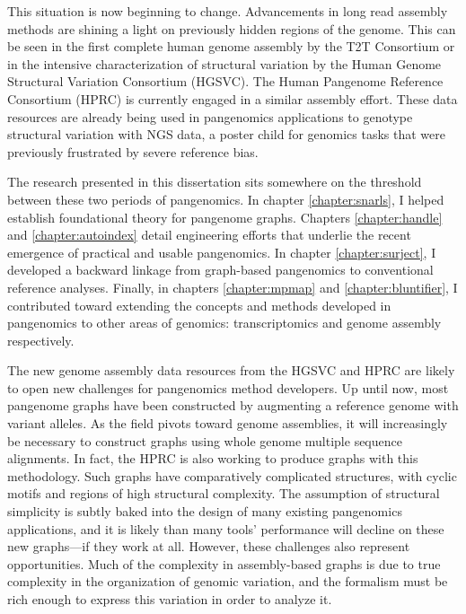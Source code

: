 \documentclass[11pt]{ucthesis}
\begin{document}
This situation is now beginning to change. Advancements in long read assembly methods are shining a light on previously hidden regions of the genome. This can be seen in the first complete human genome assembly by the T2T Consortium\cite{nurk2021complete} or in the intensive characterization of structural variation by the Human Genome Structural Variation Consortium (HGSVC)\cite{chaisson2019multi,ebert2021haplotype}. The Human Pangenome Reference Consortium (HPRC) is currently engaged in a similar assembly effort\cite{genomeweb2021hprc}. These data resources are already being used in pangenomics applications to genotype structural variation with NGS data\cite{ebler2020pangenome,siren2020genotyping}, a poster child for genomics tasks that were previously frustrated by severe reference bias.

The research presented in this dissertation sits somewhere on the threshold between these two periods of pangenomics. In chapter \ref{chapter:snarls}, I helped establish foundational theory for pangenome graphs. Chapters \ref{chapter:handle} and \ref{chapter:autoindex} detail engineering efforts that underlie the recent emergence of practical and usable pangenomics. In chapter \ref{chapter:surject}, I developed a backward linkage from graph-based pangenomics to conventional reference analyses. Finally, in chapters \ref{chapter:mpmap} and \ref{chapter:bluntifier}, I contributed toward extending the concepts and methods developed in pangenomics to other areas of genomics: transcriptomics and genome assembly respectively.

The new genome assembly data resources from the HGSVC and HPRC are likely to open new challenges for pangenomics method developers. Up until now, most pangenome graphs have been constructed by augmenting a reference genome with variant alleles\cite{garrison2018variation,kim2019graph}. As the field pivots toward genome assemblies, it will increasingly be necessary to construct graphs using whole genome multiple sequence alignments\cite{armstrong2020progressive,minkin2020scalable,li2020design}. In fact, the HPRC is also working to produce graphs with this methodology. Such graphs have comparatively complicated structures, with cyclic motifs and regions of high structural complexity. The assumption of structural simplicity is subtly baked into the design of many existing pangenomics applications, and it is likely than many tools' performance will decline on these new graphs---if they work at all. However, these challenges also represent opportunities. Much of the complexity in assembly-based graphs is due to true complexity in the organization of genomic variation, and the formalism must be rich enough to express this variation in order to analyze it.
\end{document}
